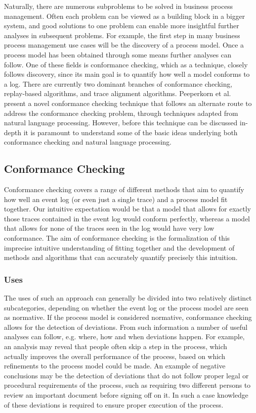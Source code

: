 \documentclass[runningheads]{template/llncs}
\begin{document}
Naturally, there are numerous subproblems to be solved in business process management.
Often each problem can be viewed as a building block in a bigger system, and good solutions to one problem can enable more insightful further analyses in subsequent problems.
For example, the first step in many business process management use cases will be the discovery of a process model.
Once a process model has been obtained through some means further analyses can follow.
One of these fields is conformance checking, which as a technique, closely follows discovery, since its main goal is to quantify how well a model conforms to a log.
There are currently two dominant branches of conformance checking, replay-based algorithms, and trace alignment algorithms.
Peeperkorn et al. present a novel conformance checking technique that follows an alternate route \cite{PBWe20} to address the conformance checking problem, through techniques adapted from natural language processing.
However, before this technique can be discussed in-depth it is paramount to understand some of the basic ideas underlying both conformance checking and natural language processing. 


\subsection{Conformance Checking}
\label{sub:conformance}
Conformance checking covers a range of different methods that aim to quantify how well an event log (or even just a single trace) and a process model fit together.
Our intuitive expectation would be that a model that allows for exactly those traces contained in the event log would conform perfectly, whereas a model that allows for none of the traces seen in the log would have very low conformance.
The aim of conformance checking is the formalization of this imprecise intuitive understanding of fitting together and the development of methods and algorithms that can accurately quantify precisely this intuition.
\subsubsection{Uses}
The uses of such an approach can generally be divided into two relatively distinct subcategories, depending on whether the event log or the process model are seen as normative.
If the process model is considered normative, conformance checking allows for the detection of deviations.
From such information a number of useful analyses can follow, e.g. where, how and when deviations happen.
For example, an analysis may reveal that people often skip a step in the process, which actually improves the overall performance of the process, based on which refinements to the process model could be made.
An example of negative conclusions may be the detection of deviations that do not follow proper legal or procedural requirements of the process, such as requiring two different persons to review an important document before signing off on it. In such a case knowledge of these deviations is required to ensure proper execution of the process.
\end{document}
